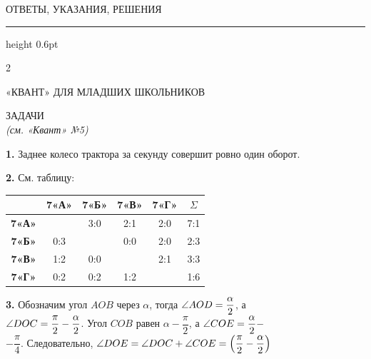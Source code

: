 
\begin{center}
    \Large{ОТВЕТЫ, УКАЗАНИЯ, РЕШЕНИЯ}
\end{center}
\vspace{-0.2cm}
\hrule height 0.6pt
\vspace{-0.2cm}


\begin{multicols}{2}

\noindent
«КВАНТ» ДЛЯ МЛАДШИХ ШКОЛЬНИКОВ
\vspace{0.3cm}

\noindent
ЗАДАЧИ \\
\small
\vspace{0.1cm}
\textit{(см. «Квант» №5)}

\vspace{0.1cm}
\noindent
\textbf{1.} Заднее колесо трактора за секунду совершит ровно один оборот.

\noindent
\textbf{2.} См. таблицу:



\begin{center}
\setlength{\tabcolsep}{3pt}
\renewcommand{\arraystretch}{1.2}
\begin{tabular}{|c|c|c|c|c|c|}
\hline
 & \textbf{7«А»} & \textbf{7«Б»} & \textbf{7«В»} & \textbf{7«Г»} & \textbf{$\Sigma$} \\
\hline
\textbf{7«А»} & \cellcolor{gray!80} & 3:0 & 2:1 & 2:0 & 7:1 \\
\hline
\textbf{7«Б»} & 0:3 & \cellcolor{gray!80} & 0:0 & 2:0 & 2:3 \\
\hline
\textbf{7«В»} & 1:2 & 0:0 & \cellcolor{gray!80} & 2:1 & 3:3 \\
\hline
\textbf{7«Г»} & 0:2 & 0:2 & 1:2 & \cellcolor{gray!80} & 1:6 \\
\hline
\end{tabular}
\end{center}


\noindent
\textbf{3.} Обозначим угол $AOB$ через $\alpha$, тогда $\angle{AOD} = \dfrac{\alpha}{2}$, а \\

\noindent
$\angle{DOC} = \dfrac{\pi}{2} - \dfrac{\alpha}{2}$. Угол $COB$ равен $\alpha - \dfrac{\pi}{2}$, а $\angle{COE} = \dfrac{\alpha}{2} -$\\

\noindent
$-\dfrac{\pi}{4}$. Следовательно, $\angle{DOE} = \angle{DOC} + \angle{COE} = \left(\dfrac{\pi}{2} - \dfrac{\alpha}{2}\right)$\\


\end{multicols}
